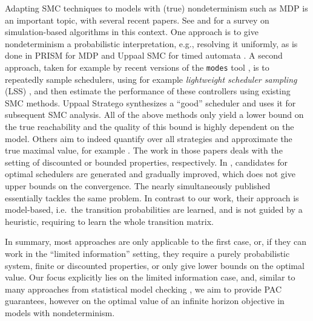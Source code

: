 \documentclass{article}
\begin{document}
Adapting SMC techniques to models with (true) nondeterminism such as MDP is an important topic, with several recent papers.
See \cite{chang2013simulation,DBLP:journals/jmlr/StrehlLL09} and \cite[Chapter~4.1.5]{DBLP:phd/dnb/Weininger22} for a survey on simulation-based algorithms in this context.
One approach is to give nondeterminism a probabilistic interpretation, e.g., resolving it uniformly, as is done in PRISM for MDP \cite{DBLP:conf/cav/KwiatkowskaNP11} and Uppaal SMC for timed automata \cite{DBLP:conf/cav/DavidLLMW11,DBLP:conf/formats/DavidLLMPVW11,DBLP:conf/ifm/Larsen13}.
A second approach, taken for example by recent versions of the \texttt{modes} tool \cite{DBLP:conf/tacas/HartmannsH14,DBLP:conf/isola/DArgenioHS18,DBLP:conf/tacas/BuddeDHS18}, is to repeatedly sample schedulers, using for example \emph{lightweight scheduler sampling} (LSS) \cite{DBLP:conf/sefm/LegayST14,DBLP:journals/sttt/DArgenioLST15}, and then estimate the performance of these controllers using existing SMC methods.
Uppaal Stratego \cite{DBLP:conf/tacas/DavidJLMT15} synthesizes a \enquote{good} scheduler and uses it for subsequent SMC analysis.
All of the above methods only yield a lower bound on the true reachability and the quality of this bound is highly dependent on the model.
Others aim to indeed quantify over all strategies and approximate the true maximal value, for example \cite{DBLP:journals/sttt/LassaigneP15,DBLP:conf/qest/HenriquesMZPC12}.
The work in those papers deals with the setting of discounted or bounded properties, respectively.
In \cite{DBLP:conf/qest/HenriquesMZPC12}, candidates for optimal schedulers are generated and gradually improved, which does not give upper bounds on the convergence.
The nearly simultaneously published \cite{DBLP:conf/rss/FuT14} essentially tackles the same problem.
In contrast to our work, their approach is model-based, i.e.\ the transition probabilities are learned, and is not guided by a heuristic, requiring to learn the whole transition matrix.

In summary, most approaches are only applicable to the first case, or, if they can work in the \enquote{limited information} setting, they require a purely probabilistic system, finite or discounted properties, or only give lower bounds on the optimal value.
Our focus explicitly lies on the limited information case, and, similar to many approaches from statistical model checking \cite{DBLP:conf/cav/YounesS02,DBLP:conf/vmcai/HeraultLMP04,DBLP:conf/cav/SenVA04,DBLP:conf/rss/FuT14}, we aim to provide PAC guarantees, however on the optimal value of an infinite horizon objective in models with nondeterminism.
\end{document}
